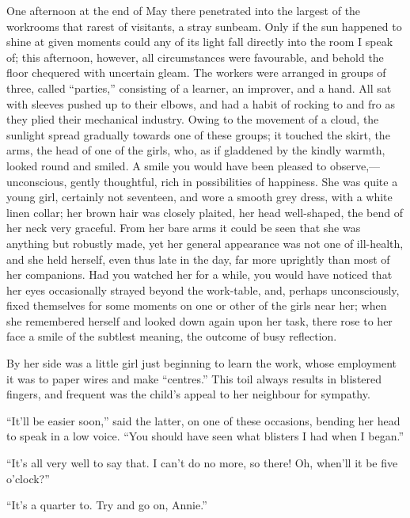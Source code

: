One afternoon at the end of May there penetrated into the largest of the
workrooms that rarest of visitants, a stray sunbeam. Only if the sun
happened to shine at given moments could any of its light fall directly
into the room I speak of; this afternoon, however, all circumstances
were favourable, and behold the floor chequered with uncertain gleam.
The workers were arranged in groups of three, called ``parties,''
consisting of a learner, an improver, and a hand. All sat with sleeves
pushed up to their elbows, and had a habit of rocking to and fro as they
plied their mechanical industry. Owing to the movement of a cloud, the
sunlight spread gradually towards one of these groups; it touched the
skirt, the arms, the head of one of the girls, who, as if gladdened by
the {\protect\hypertarget{20}{}{}}kindly warmth, looked round and
smiled. A smile you would have been pleased to observe,---unconscious,
gently thoughtful, rich in possibilities of happiness. She was quite a
young girl, certainly not seventeen, and wore a smooth grey dress, with
a white linen collar; her brown hair was closely plaited, her head
well-shaped, the bend of her neck very graceful. From her bare arms it
could be seen that she was anything but robustly made, yet her general
appearance was not one of ill-health, and she held herself, even thus
late in the day, far more uprightly than most of her companions. Had you
watched her for a while, you would have noticed that her eyes
occasionally strayed beyond the work-table, and, perhaps unconsciously,
fixed themselves for some moments on one or other of the girls near her;
when she remembered herself and looked down again upon her task, there
rose to her face a smile of the subtlest meaning, the outcome of busy
reflection.

By her side was a little girl just beginning to learn the work, whose
employment it was {\protect\hypertarget{21}{}{}}to paper wires and make
``centres.'' This toil always results in blistered fingers, and frequent
was the child's appeal to her neighbour for sympathy.

``It'll be easier soon,'' said the latter, on one of these occasions,
bending her head to speak in a low voice. ``You should have seen what
blisters I had when I began.''

``It's all very well to say that. I can't do no more, so there! Oh,
when'll it be five o'clock?''

``It's a quarter to. Try and go on, Annie.''

